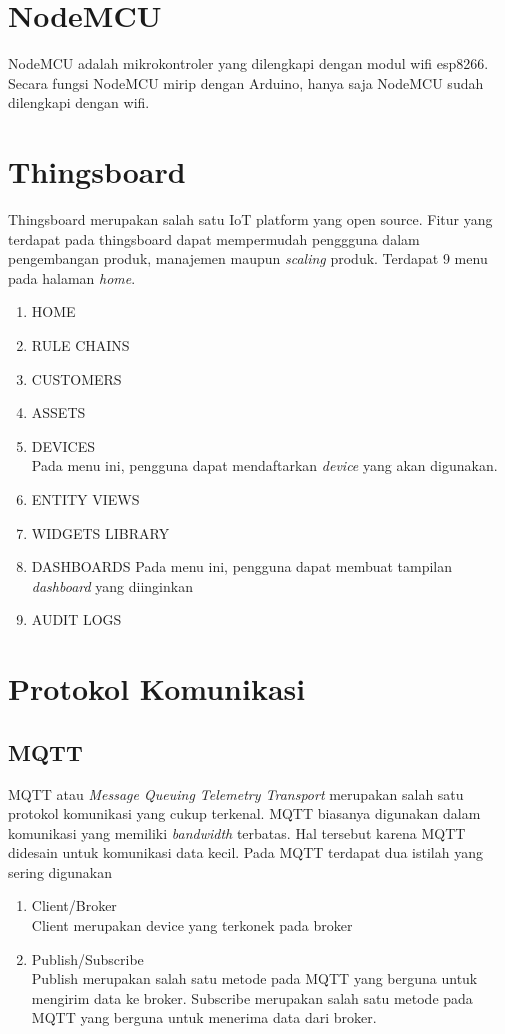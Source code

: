 \documentclass{class}
\begin{document}
  \section{NodeMCU}
  NodeMCU adalah mikrokontroler yang dilengkapi dengan modul wifi esp8266. 
  Secara fungsi NodeMCU mirip dengan Arduino, hanya saja NodeMCU sudah dilengkapi dengan wifi.

  \section{Thingsboard}
  Thingsboard merupakan salah satu IoT platform yang open source. 
  Fitur yang terdapat pada thingsboard dapat mempermudah penggguna dalam pengembangan produk, manajemen maupun \emph{scaling} produk. 
  Terdapat 9 menu pada halaman \emph{home}. 
    \begin{enumerate}
      \item HOME
      \item RULE CHAINS
      \item CUSTOMERS
      \item ASSETS
      \item DEVICES \\
      Pada menu ini, pengguna dapat mendaftarkan \emph{device} yang akan digunakan.
      \item ENTITY VIEWS
      \item WIDGETS LIBRARY
      \item DASHBOARDS
      Pada menu ini, pengguna dapat membuat tampilan \emph{dashboard} yang diinginkan
      \item AUDIT LOGS
    \end{enumerate}
  \section{Protokol Komunikasi}
  \subsection{MQTT}
  MQTT atau \emph{Message Queuing Telemetry Transport} merupakan salah satu protokol komunikasi yang cukup terkenal.
  MQTT biasanya digunakan dalam komunikasi yang memiliki \emph{bandwidth} terbatas. 
  Hal tersebut karena MQTT didesain untuk komunikasi data kecil.
  Pada MQTT terdapat dua istilah yang sering digunakan
  \begin{enumerate}
    \item Client/Broker \\
    Client merupakan device yang terkonek pada broker
    \item Publish/Subscribe \\
    Publish merupakan salah satu metode pada MQTT yang berguna untuk mengirim data ke broker.
    Subscribe merupakan salah satu metode pada MQTT yang berguna untuk menerima data dari broker. \\
  \end{enumerate}
\end{document}
